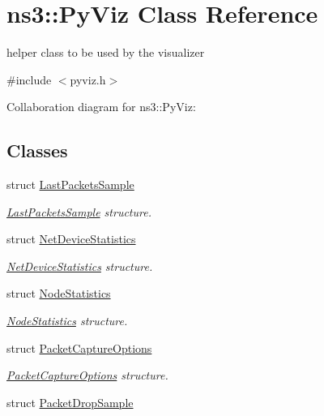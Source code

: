 \hypertarget{classns3_1_1PyViz}{}\section{ns3\+:\+:Py\+Viz Class Reference}
\label{classns3_1_1PyViz}


helper class to be used by the visualizer  




{\ttfamily \#include $<$pyviz.\+h$>$}



Collaboration diagram for ns3\+:\+:Py\+Viz\+:
\subsection*{Classes}
\begin{DoxyCompactItemize}
\item 
struct \hyperlink{structns3_1_1PyViz_1_1LastPacketsSample}{Last\+Packets\+Sample}
\begin{DoxyCompactList}\small\item\em \hyperlink{structns3_1_1PyViz_1_1LastPacketsSample}{Last\+Packets\+Sample} structure. \end{DoxyCompactList}\item 
struct \hyperlink{structns3_1_1PyViz_1_1NetDeviceStatistics}{Net\+Device\+Statistics}
\begin{DoxyCompactList}\small\item\em \hyperlink{structns3_1_1PyViz_1_1NetDeviceStatistics}{Net\+Device\+Statistics} structure. \end{DoxyCompactList}\item 
struct \hyperlink{structns3_1_1PyViz_1_1NodeStatistics}{Node\+Statistics}
\begin{DoxyCompactList}\small\item\em \hyperlink{structns3_1_1PyViz_1_1NodeStatistics}{Node\+Statistics} structure. \end{DoxyCompactList}\item 
struct \hyperlink{structns3_1_1PyViz_1_1PacketCaptureOptions}{Packet\+Capture\+Options}
\begin{DoxyCompactList}\small\item\em \hyperlink{structns3_1_1PyViz_1_1PacketCaptureOptions}{Packet\+Capture\+Options} structure. \end{DoxyCompactList}\item 
struct \hyperlink{structns3_1_1PyViz_1_1PacketDropSample}{Packet\+Drop\+Sample}

\end{DoxyCompactItemize}
